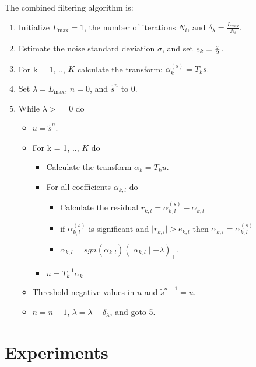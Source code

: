 The combined filtering algorithm is:
\begin{enumerate}
\baselineskip=0.4truecm
\itemsep=0.1truecm
\item Initialize $L_{\max} = 1$, the number of iterations $N_i$, and
  $\delta_{\lambda} = \frac{L_{\max}}{N_i}$.
\item Estimate the noise standard deviation $\sigma$, and set $e_k =
  {\sigma \over 2}$.
\item For k = 1, .., $K$ calculate the transform: $\alpha^{(s)}_k
  = T_k s$.
\item Set $\lambda = L_{\max}$, $n = 0$, and $\tilde s^{n}$ to 0.
\item While $\lambda >= 0$ do
\begin{itemize}
\item $u = \tilde s^{n}$.
\item For k = 1, .., $K$ do
  \begin{itemize}
  \item Calculate the transform $\alpha_{k} = T_k u$.
  \item For all coefficients $\alpha_{k,l}$ do
     \begin{itemize}
     \item Calculate the residual $r_{k,l} = \alpha^{(s)}_{k,l} -
       \alpha_{k,l}$
       
     \item if $\alpha^{(s)}_{k,l}$ is significant and $ \mid r_{k,l}
       \mid > e_{k,l}$ then $\alpha_{k,l} = \alpha^{(s)}_{k,l}$
     \item $\alpha_{k,l} = sgn(\alpha_{k,l}) ( \mid \alpha_{k,l} \mid - \lambda)_{+}$.
     \end{itemize}
   \item $u = T_k^{-1} \alpha_{k}$
  \end{itemize}
\item Threshold negative values in $u$ and $\tilde s^{n+1} = u$.
\item $n = n + 1$, $\lambda = \lambda - \delta_{\lambda} $, and goto 5.
\end{itemize}
\end{enumerate}

\section{Experiments}

